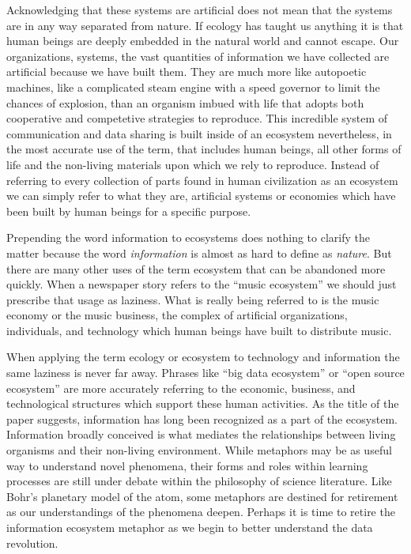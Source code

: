 Acknowledging that these systems are artificial does not mean that the systems are in any way separated from nature. If ecology has taught us anything it is that human beings are deeply embedded in the natural world and cannot escape. Our organizations, systems, the vast quantities of information we have collected are artificial because we have built them. They are much more like autopoetic machines, like a complicated steam engine with a speed governor to limit the chances of explosion, than an organism imbued with life that adopts both cooperative and competetive strategies to reproduce. This incredible system of communication and data sharing is built inside of an ecosystem nevertheless, in the most accurate use of the term, that includes human beings, all other forms of life and the non-living materials upon which we rely to reproduce. Instead of referring to every collection of parts found in human civilization as an ecosystem we can simply refer to what they are, artificial systems or economies which have been built by human beings for a specific purpose.

Prepending the word information to ecosystems does nothing to clarify the matter because the word \textit{information} is almost as hard to define as \textit{nature}. But there are many other uses of the term ecosystem that can be abandoned more quickly. When a newspaper story refers to the “music ecosystem” we should just prescribe that usage as laziness. What is really being referred to is the music economy or the music business, the complex of artificial organizations, individuals, and technology which human beings have built to distribute music.

When applying the term ecology or ecosystem to technology and information the same laziness is never far away. Phrases like “big data ecosystem” or “open source ecosystem” are more accurately referring to the economic, business, and technological structures which support these human activities. As the title of the paper suggests, information has long been recognized as a part of the ecosystem. Information broadly conceived is what mediates the relationships between living organisms and their non-living environment. While metaphors may be as useful way to understand novel phenomena, their forms and roles within learning processes are still under debate within the philosophy of science literature. Like Bohr's planetary model of the atom, some metaphors are destined for retirement as our understandings of the phenomena deepen. Perhaps it is time to retire the information ecosystem metaphor as we begin to better understand the data revolution.

